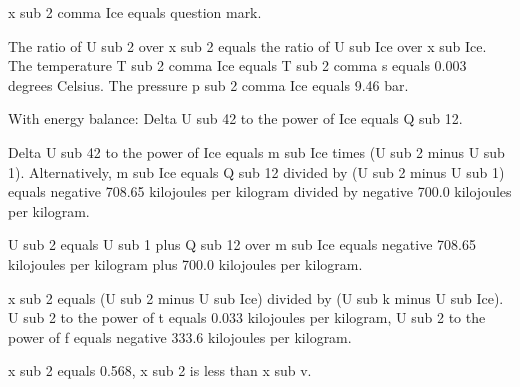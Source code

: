 x sub 2 comma Ice equals question mark.

The ratio of U sub 2 over x sub 2 equals the ratio of U sub Ice over x sub Ice. The temperature T sub 2 comma Ice equals T sub 2 comma s equals 0.003 degrees Celsius. The pressure p sub 2 comma Ice equals 9.46 bar.

With energy balance: Delta U sub 42 to the power of Ice equals Q sub 12.

Delta U sub 42 to the power of Ice equals m sub Ice times (U sub 2 minus U sub 1). Alternatively, m sub Ice equals Q sub 12 divided by (U sub 2 minus U sub 1) equals negative 708.65 kilojoules per kilogram divided by negative 700.0 kilojoules per kilogram.

U sub 2 equals U sub 1 plus Q sub 12 over m sub Ice equals negative 708.65 kilojoules per kilogram plus 700.0 kilojoules per kilogram.

x sub 2 equals (U sub 2 minus U sub Ice) divided by (U sub k minus U sub Ice). U sub 2 to the power of t equals 0.033 kilojoules per kilogram, U sub 2 to the power of f equals negative 333.6 kilojoules per kilogram.

x sub 2 equals 0.568, x sub 2 is less than x sub v.